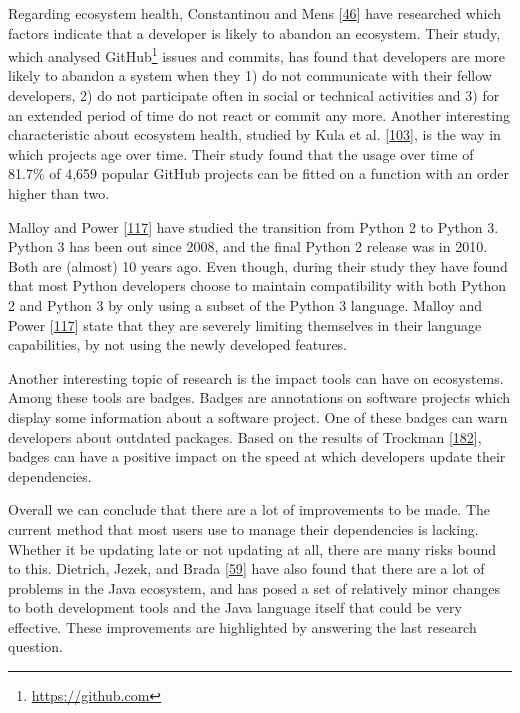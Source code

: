 \documentclass[]{book}
\let\rmarkdownfootnote\footnote%
\def\footnote{\protect\rmarkdownfootnote}
\begin{document}
Regarding ecosystem health, Constantinou and Mens
{[}\protect\hyperlink{ref-Constantinou2017}{46}{]} have researched which
factors indicate that a developer is likely to abandon an ecosystem.
Their study, which analysed GitHub\footnote{\url{https://github.com}}
issues and commits, has found that developers are more likely to abandon
a system when they 1) do not communicate with their fellow developers,
2) do not participate often in social or technical activities and 3) for
an extended period of time do not react or commit any more. Another
interesting characteristic about ecosystem health, studied by Kula et
al. {[}\protect\hyperlink{ref-Kula2017-2}{103}{]}, is the way in which
projects age over time. Their study found that the usage over time of
81.7\% of 4,659 popular GitHub projects can be fitted on a function with
an order higher than two.

Malloy and Power {[}\protect\hyperlink{ref-Malloy2018}{117}{]} have
studied the transition from Python 2 to Python 3. Python 3 has been out
since 2008, and the final Python 2 release was in 2010. Both are
(almost) 10 years ago. Even though, during their study they have found
that most Python developers choose to maintain compatibility with both
Python 2 and Python 3 by only using a subset of the Python 3 language.
Malloy and Power {[}\protect\hyperlink{ref-Malloy2018}{117}{]} state
that they are severely limiting themselves in their language
capabilities, by not using the newly developed features.

Another interesting topic of research is the impact tools can have on
ecosystems. Among these tools are badges. Badges are annotations on
software projects which display some information about a software
project. One of these badges can warn developers about outdated
packages. Based on the results of Trockman
{[}\protect\hyperlink{ref-Trockman2018}{182}{]}, badges can have a
positive impact on the speed at which developers update their
dependencies.

Overall we can conclude that there are a lot of improvements to be made.
The current method that most users use to manage their dependencies is
lacking. Whether it be updating late or not updating at all, there are
many risks bound to this. Dietrich, Jezek, and Brada
{[}\protect\hyperlink{ref-Dietrich2014}{59}{]} have also found that
there are a lot of problems in the Java ecosystem, and has posed a set
of relatively minor changes to both development tools and the Java
language itself that could be very effective. These improvements are
highlighted by answering the last research question.
\end{document}
